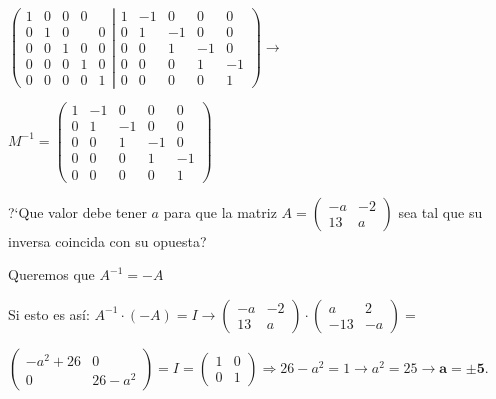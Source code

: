 \begin{proofw}
   \noindent $\left( \begin{array}{ccccc}
 1&0&0&0&\\0&1&0&&0\\0&0&1&0&0\\0&0&0&1&0\\0&0&0&0&1	
 \end{array} \right. \left| \begin{array}{ccccc}
 1&-1&0&0&0\\0&1&-1&0&0\\0&0&1&-1&0\\0&0&0&1&-1\\0&0&0&0&1	
 \end{array} \right) \to $
 
 \noindent $M^{-1}= \left( \begin{array}{ccccc}
 1&-1&0&0&0\\0&1&-1&0&0\\0&0&1&-1&0\\0&0&0&1&-1\\0&0&0&0&1	
 \end{array} \right)$
 
\end{proofw}


\begin{ejre}
	?`Que valor debe tener $a$ para que la matriz $A=\left( \begin{matrix} -a&-2 \\ 13&a \end{matrix} \right)$ sea tal que su inversa coincida con su opuesta?
\end{ejre}


\begin{proofw}\renewcommand{\qedsymbol}{$\diamond$} Queremos que $A^{-1}=-A$

\noindent Si esto es así: $A^{-1}\cdot (-A)=I \to  \left( \begin{matrix} -a&-2 \\ 13&a \end{matrix} \right) \cdot 
\left( \begin{matrix} a&2 \\ -13&-a \end{matrix} \right) = $

\small{\noindent $\left( \begin{matrix}-a^2+26 &0 \\ 0&26-a^2 \end{matrix} \right)=I=
\left( \begin{matrix} 1&0 \\ 0&1 \end{matrix} \right) \Rightarrow 26-a^2=1\to a^2=25 \to \boldsymbol{a=\pm 5}$}\normalsize{.}
	
\end{proofw}

